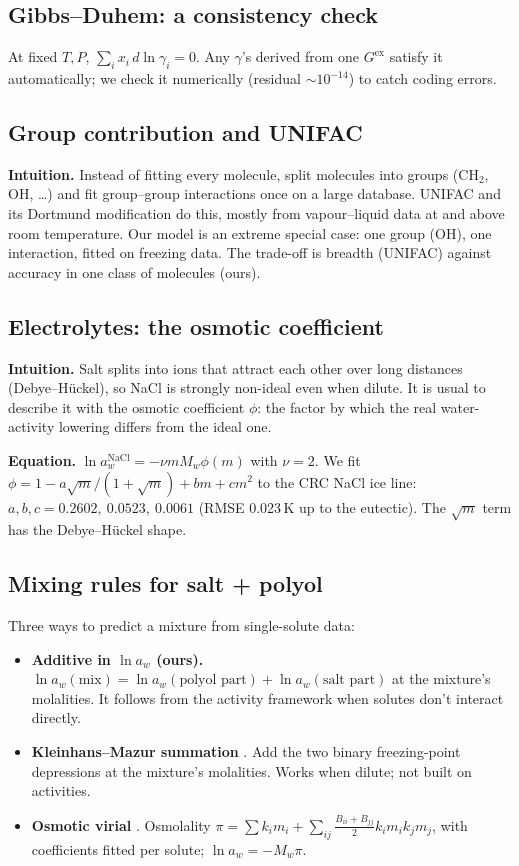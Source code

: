 \documentclass[11pt,a4paper]{article}
\begin{document}
\subsection{Gibbs--Duhem: a consistency check}
At fixed $T,P$, $\sum_i x_i\,d\ln\gamma_i=0$. Any $\gamma$'s derived from one $G^{\mathrm{ex}}$ satisfy it
automatically; we check it numerically (residual $\sim10^{-14}$) to catch coding errors.

\subsection{Group contribution and UNIFAC}
\textbf{Intuition.} Instead of fitting every molecule, split molecules into groups (CH$_2$, OH, \ldots) and fit
group--group interactions once on a large database. UNIFAC \cite{unifac} and its Dortmund modification \cite{dortmund}
do this, mostly from vapour--liquid data at and above room temperature. Our model is an extreme special case: one
group (OH), one interaction, fitted on freezing data. The trade-off is breadth (UNIFAC) against accuracy in one
class of molecules (ours).

\subsection{Electrolytes: the osmotic coefficient}
\textbf{Intuition.} Salt splits into ions that attract each other over long distances (Debye--H\"uckel), so NaCl is
strongly non-ideal even when dilute. It is usual to describe it with the osmotic coefficient $\phi$: the factor by
which the real water-activity lowering differs from the ideal one.

\textbf{Equation.} $\ln a_w^{\mathrm{NaCl}}=-\nu mM_w\phi(m)$ with $\nu=2$. We fit
$\phi=1-a\sqrt m/(1+\sqrt m)+bm+cm^2$ to the CRC NaCl ice line: $a,b,c=0.2602,\ 0.0523,\ 0.0061$ (RMSE 0.023\,K up to
the eutectic). The $\sqrt m$ term has the Debye--H\"uckel shape.

\subsection{Mixing rules for salt + polyol}
Three ways to predict a mixture from single-solute data:
\begin{itemize}
\item \textbf{Additive in $\ln a_w$ (ours).} $\ln a_w(\text{mix})=\ln a_w(\text{polyol part})+\ln a_w(\text{salt part})$
at the mixture's molalities. It follows from the activity framework when solutes don't interact directly.
\item \textbf{Kleinhans--Mazur summation} \cite{km}. Add the two binary freezing-point depressions at the mixture's
molalities. Works when dilute; not built on activities.
\item \textbf{Osmotic virial} \cite{elliott,zielinski}. Osmolality $\pi=\sum k_im_i+\sum_{ij}\tfrac{B_{ii}+B_{jj}}2k_im_ik_jm_j$,
with coefficients fitted per solute; $\ln a_w=-M_w\pi$.
\end{itemize}
\end{document}
